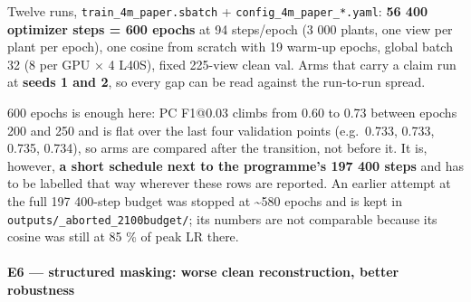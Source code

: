 \documentclass[
  10pt,
]{article}
\begin{document}
Twelve runs, \texttt{train\_4m\_paper.sbatch} +
\texttt{config\_4m\_paper\_*.yaml}: \textbf{56 400 optimizer steps = 600
epochs} at 94 steps/epoch (3 000 plants, one view per plant per epoch),
one cosine from scratch with 19 warm-up epochs, global batch 32 (8 per
GPU × 4 L40S), fixed 225-view clean val. Arms that carry a claim run at
\textbf{seeds 1 and 2}, so every gap can be read against the run-to-run
spread.

600 epochs is enough here: PC F1@0.03 climbs from 0.60 to 0.73 between
epochs 200 and 250 and is flat over the last four validation points
(e.g.~0.733, 0.733, 0.735, 0.734), so arms are compared after the
transition, not before it. It is, however, \textbf{a short schedule next
to the programme's 197 400 steps} and has to be labelled that way
wherever these rows are reported. An earlier attempt at the full 197
400-step budget was stopped at \textasciitilde580 epochs and is kept in
\texttt{outputs/\_aborted\_2100budget/}; its numbers are not comparable
because its cosine was still at 85 \% of peak LR there.

\paragraph{E6 --- structured masking: worse clean reconstruction, better
robustness}\label{e6-structured-masking-worse-clean-reconstruction-better-robustness}
\end{document}
